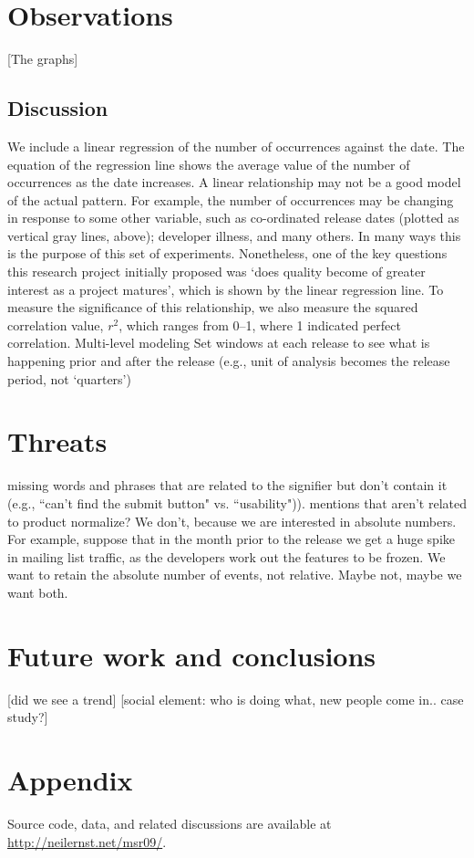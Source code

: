 \documentclass[conference, compsoc]{IEEEtran}
\begin{document}
\section{Observations}
[The graphs]
\subsection{Discussion}
We include a linear regression of the number of occurrences against the date. The equation of the regression line shows the average value of the number of occurrences as the date increases. A linear relationship may not be a good model of the actual pattern. For example, the number of occurrences may be changing in response to some other variable, such as co-ordinated release dates (plotted as vertical gray lines, above); developer illness, and many others. In many ways this is the purpose of this set of experiments. Nonetheless, one of the key questions this research project initially proposed was `does quality become of greater interest as a project matures', which is shown by the linear regression line. To measure the significance of this relationship, we also measure the squared correlation value, $r^2$, which ranges from 0--1, where 1 indicated perfect correlation.
Multi-level modeling
Set windows at each release to see what is happening prior and after the release (e.g., unit of analysis becomes the release period, not `quarters')
\section{Threats}
missing words and phrases that are related to the signifier but don't contain it (e.g., ``can't find the submit button" vs. ``usability")). 
mentions that aren't related to product
normalize? We don't, because we are interested in absolute numbers. For example, suppose that in the month prior to the release we get a huge spike in mailing list traffic, as the developers work out the features to be frozen. We want to retain the absolute number of events, not relative. Maybe not, maybe we want both.
\section{Future work and conclusions}
[did we see a trend]
[social element: who is doing what, new people come in.. case study?]
\section{Appendix}
Source code, data, and related discussions are available at \url{http://neilernst.net/msr09/}.
\begin{footnotesize}

\end{footnotesize}
\end{document}
